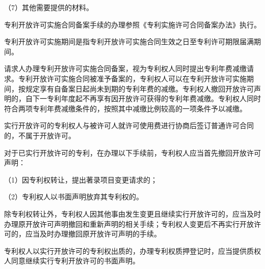 {\setlength{\parindent}{17.1bp}（7）其他需要提供的材料。\par}

专利开放许可实施合同备案手续的办理参照《专利实施许可合同备案办法》执行。

专利开放许可实施期间是指专利开放许可实施合同生效之日至专利许可期限届满期间。

请求人办理专利开放许可实施合同备案，视为专利权人同时提出专利年费减缴请求。专利开放许可实施合同被准予备案的，专利权人可以在专利开放许可实施期间，按规定享有自备案日起尚未到期的专利年费的减缴。专利权人撤回开放许可声明的，自下一专利年度起不再享有因开放许可获得的专利年费减缴。专利权人同时符合两项专利年费减缴条件的，按照其中减缴比例较高的一项条件予以减缴。

实行开放许可的专利权人与被许可人就许可使用费进行协商后签订普通许可合同的，不属于开放许可。

对于已实行开放许可的专利，在办理以下手续前，专利权人应当首先撤回开放许可声明：

{\setlength{\parindent}{17.1bp}（1）因专利权转让，提出著录项目变更请求的；\par}

{\setlength{\parindent}{17.1bp}（2）专利权人以书面声明放弃其专利权的。\par}

除专利权转让外，专利权人因其他事由发生变更且继续实行开放许可的，应当及时办理原开放许可声明撤回和重新声明的相关手续；专利权人变更后不再实行开放许可的，应当及时办理撤回原开放许可声明的手续。

专利权人以实行开放许可的专利权出质的，办理专利权质押登记时，应当提供质权人同意继续实行专利开放许可的书面声明。

\stopparttoc

